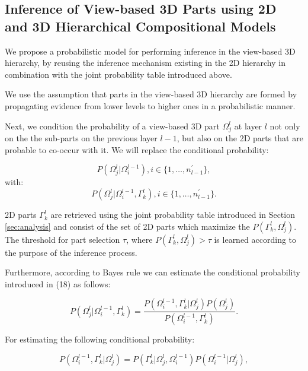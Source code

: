 \documentclass[runningheads]{llncs}
\begin{document}
\subsection{Inference of View-based 3D Parts using 2D and 3D Hierarchical Compositional Models}
\label{sec:inference}

We propose a probabilistic model for performing inference in the view-based 3D hierarchy, by reusing the inference mechanism existing in the 2D hierarchy in combination with the joint probability table introduced above.

We use the assumption that parts in the view-based 3D hierarchy are formed by propagating evidence from lower levels to higher ones in a probabilistic manner. 

Next, we condition the probability of a view-based 3D part $\Omega_j^{l}$ at layer $l$ not only on the the sub-parts on the previous layer $l-1$, but also on the 2D parts that are probable to co-occur with it. We will replace the conditional probability:

\begin{equation}
 P(\Omega_j^{l} \vert \Omega_i^{l-1}), i \in \{1,\dots,n_{l-1}^{'}\},
\end{equation}
with:
\begin{equation}
 P(\Omega_j^{l} \vert \Omega_i^{l-1},\Gamma_k^l), i \in \{1,\dots,n_{l-1}^{'}\}.
\end{equation}

2D parts $\Gamma_k^l$ are retrieved using the joint probability table introduced in Section \ref{sec:analysis} and consist of the set of 2D parts which maximize the $P(\Gamma_k^l,\Omega_j^l)$. The threshold for part selection $\tau$, where $P(\Gamma_k^l,\Omega_j^l)>\tau$ is learned according to the purpose of the inference process.

Furthermore, according to Bayes rule we can estimate the conditional probability introduced in (18) as follows:

\begin{equation}
 P(\Omega_j^{l} \vert \Omega_i^{l-1},\Gamma_k^l) = \frac{P(\Omega_i^{l-1},\Gamma_k^l \vert \Omega_j^{l})P(\Omega_j^{l})}{P(\Omega_i^{l-1},\Gamma_k^l)}.
\end{equation}

For estimating the following conditional probability:

\begin{equation}
 P(\Omega_i^{l-1},\Gamma_k^l \vert \Omega_j^{l}) =  P(\Gamma_k^l \vert \Omega_j^{l},\Omega_i^{l-1}) P(\Omega_i^{l-1} \vert \Omega_j^{l}),
\end{equation}
\end{document}
